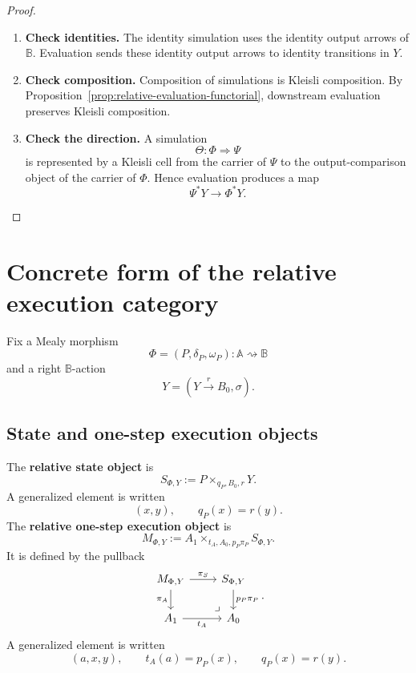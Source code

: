 \begin{proof}
\leavevmode
\begin{enumerate}
\item \textbf{Check identities.}
The identity simulation uses the identity output arrows of \(\mathbb B\).
Evaluation sends these identity output arrows to identity transitions in \(Y\).

\item \textbf{Check composition.}
Composition of simulations is Kleisli composition. By
Proposition~\ref{prop:relative-evaluation-functorial}, downstream evaluation
preserves Kleisli composition.

\item \textbf{Check the direction.}
A simulation
\[
\Theta:\Phi\Rightarrow\Psi
\]
is represented by a Kleisli cell from the carrier of \(\Psi\) to the
output-comparison object of the carrier of \(\Phi\). Hence evaluation produces
a map
\[
\Psi^\ast Y\to\Phi^\ast Y.
\]
\end{enumerate}
\end{proof}

\section{Concrete form of the relative execution category}
\label{sec:relative-program-categories}

Fix a Mealy morphism
\[
\Phi=(P,\delta_P,\omega_P):\mathbb A\rightsquigarrow\mathbb B
\]
and a right \(\mathbb B\)-action
\[
Y=(Y\xrightarrow{r}B_0,\sigma).
\]

\subsection{State and one-step execution objects}
\label{subsec:relative-state-primitive-objects}

\begin{definition}
\label{def:relative-state-and-primitive}
The \textbf{relative state object} is
\[
S_{\Phi,Y}:=P\times_{q_P,B_0,r}Y.
\]
A generalized element is written
\[
(x,y),
\qquad
q_P(x)=r(y).
\]
The \textbf{relative one-step execution object} is
\[
M_{\Phi,Y}
:=
A_1\times_{t_A,A_0,p_P\pi_P}S_{\Phi,Y}.
\]
It is defined by the pullback
\[
\begin{tikzcd}
M_{\Phi,Y}
\arrow[r,"\pi_S"]
\arrow[d,"\pi_A"']
&
S_{\Phi,Y}
\arrow[d,"p_P\pi_P"]
\\
A_1
\arrow[r,"t_A"']
&
A_0
\arrow[ul,phantom,very near start,"\lrcorner"]
\end{tikzcd}
.
\]
A generalized element is written
\[
(a,x,y),
\qquad
t_A(a)=p_P(x),
\qquad
q_P(x)=r(y).
\]
\end{definition}

